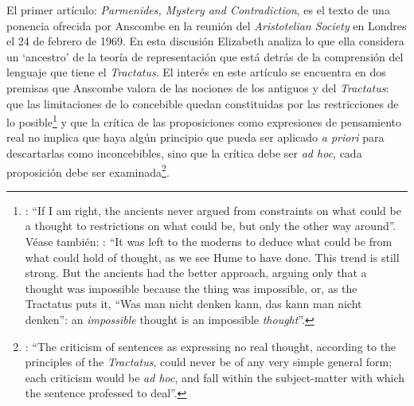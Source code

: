 El primer artículo: \emph{Parmenides, Mystery and Contradiction}, es el texto de una ponencia ofrecida por Anscombe en la reunión del \emph{Aristotelian Society} en Londres el 24 de febrero de 1969. En esta discusión Elizabeth analiza lo que ella considera un `ancestro' de la teoría de representación que está detrás de la comprensión del lenguaje que tiene el \emph{Tractatus}. El interés en este artículo se encuentra en dos premisas que Anscombe valora de las nociones de los antiguos y del \emph{Tractatus}: que las limitaciones de lo concebible quedan constituidas por las restricciones de lo posible\footnote{\Cite[Cf.][viii]{anscombe1981parmenides}: \enquote{If I am right, the ancients never argued from constraints on what could be a thought to restrictions on what could be, but only the other way around}. Véase también: \cite[xi]{anscombe1981parmenides}: \enquote{It was left to the moderns to deduce what could be from what could hold of thought, as we see Hume to have done. This trend is still strong. But the ancients had the better approach, arguing only that a thought was impossible because the thing was impossible, or, as the Tractatus puts it, ``Was man nicht denken kann, das kann man nicht denken'': an \emph{impossible} thought is an impossible \emph{thought}}.} y que la crítica de las proposiciones como expresiones de pensamiento real no implica que haya algún principio que pueda ser aplicado \emph{a priori} para descartarlas como inconcebibles, sino que la crítica debe ser \emph{ad hoc}, cada proposición debe ser examinada\footnote{\Cite[Cf.][151]{anscombe1959iwt}: \enquote{The criticism of sentences as expressing no real thought, according to the principles of the \emph{Tractatus}, could never be of any very simple general form; each criticism would be \emph{ad hoc}, and fall within the subject-matter with which the sentence professed to deal}.}.

